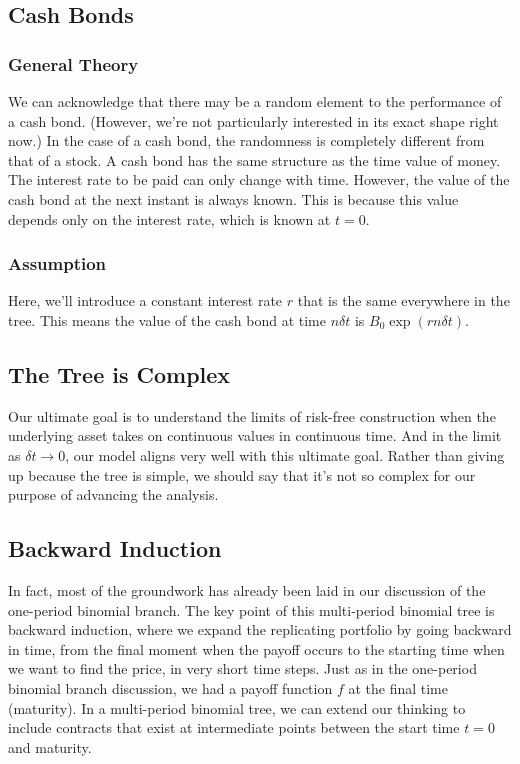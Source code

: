 \documentclass[uplatex,a4j,12pt,dvipdfmx]{jsarticle}
\begin{document}
\subsection{Cash Bonds}
\subsubsection{General Theory}
We can acknowledge that there may be a random element to the performance of a cash bond. (However, we're not particularly interested in its exact shape right now.) In the case of a cash bond, the randomness is completely different from that of a stock. A cash bond has the same structure as the time value of money. The interest rate to be paid can only change with time. However, the value of the cash bond at the next instant is always known. This is because this value depends only on the interest rate, which is known at $t=0$.
\subsubsection{Assumption}
Here, we'll introduce a constant interest rate $r$ that is the same everywhere in the tree. This means the value of the cash bond at time $n\delta t$ is $B_0 \exp(rn\delta t)$.

\subsection{The Tree is Complex}
Our ultimate goal is to understand the limits of risk-free construction when the underlying asset takes on continuous values in continuous time. And in the limit as $\delta t \to 0$, our model aligns very well with this ultimate goal. Rather than giving up because the tree is simple, we should say that it's not so complex for our purpose of advancing the analysis.

\subsection{Backward Induction}
In fact, most of the groundwork has already been laid in our discussion of the one-period binomial branch. The key point of this multi-period binomial tree is backward induction, where we expand the replicating portfolio by going backward in time, from the final moment when the payoff occurs to the starting time when we want to find the price, in very short time steps. Just as in the one-period binomial branch discussion, we had a payoff function $f$ at the final time (maturity). In a multi-period binomial tree, we can extend our thinking to include contracts that exist at intermediate points between the start time $t=0$ and maturity.
\end{document}
